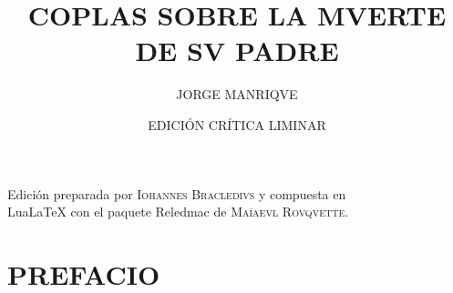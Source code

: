 \documentclass[11pt,a4paper,twoside]{article}
\title{\huge COPLAS SOBRE LA MVERTE DE SV PADRE}
\author{JORGE MANRIQVE}
\date{\vspace{60pt}\small EDICIÓN CRÍTICA LIMINAR\\\fontsize{40}{11}\selectfont{\vfill\LaTeX}}
\begin{document}
	{
	\maketitle
}
	\newpage
%
\hskip0pt
\vfill
\begin{flushright}
	Edición preparada por \textsc{Iohannes Bracledivs} y compuesta en\\ LuaLaTeX con el paquete Reledmac de \textsc{Maïaevl Rovqvette}.
\end{flushright}
\newpage
%
\tableofcontents
\newpage
%
\setcounter{page}{1}
\section*{\centering\normalsize PREFACIO}
\end{document}
